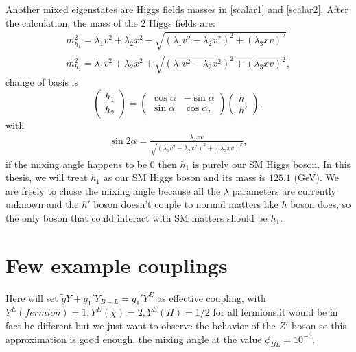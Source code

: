 \documentclass{report}
\numberwithin{equation}{section}
\begin{document}
Another mixed eigenstates are Higgs fields masses in \eqref{scalar1} and \eqref{scalar2}. After the calculation, the mass of the 2 Higgs fields are:
\begin{align}
m_{h_1}^2=\lambda_1 v^2+\lambda_2 x^2-\sqrt{(\lambda_1 v^2-\lambda_2 x^2)^2+(\lambda_3 x v)^2}\\
m_{h_2}^2=\lambda_1 v^2+\lambda_2 x^2+\sqrt{(\lambda_1 v^2-\lambda_2 x^2)^2+(\lambda_3 x v)^2},
\end{align}
change of basis is
\begin{equation}
\begin{pmatrix}
h_1\\ h_2
\end{pmatrix}=\begin{pmatrix}
\cos \alpha & -\sin \alpha\\
\sin \alpha & \cos \alpha,
\end{pmatrix}\begin{pmatrix}
h\\ h'
\end{pmatrix},\label{higgsmix}
\end{equation}
with
\begin{align}
\sin 2\alpha=\frac{\lambda_3 x v}{\sqrt{(\lambda_1 v^2- \lambda_2 x^2)^2+(\lambda_3 x v)^2}},
\end{align}
if the mixing angle happens to be 0 then $h_1$ is purely our SM Higgs boson. In this thesis, we will treat $h_1$ as our SM Higgs boson and its mass is $125.1$ (GeV). We are freely to chose the mixing angle because all the $\lambda$ parameters are currently unknown and the $h'$ boson doesn't couple to normal matters like $h$ boson does, so the only boson that could interact with SM matters should be $h_1$.
\section{Few example couplings}
Here will set $\tilde{g} Y+g_1' Y_{B-L}=g_1' Y^E$ as effective coupling, with $Y^E(fermion)=1,Y^E(\chi)=2,Y^E(H)=1/2$ for all fermions,it would be in fact be different but we just want to observe the behavior of the $Z'$ boson so this approximation is good enough, the mixing angle at the value $\phi_{BL}=10^{-3}$.
\end{document}
